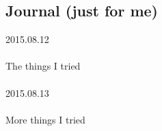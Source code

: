 \subsection{Journal (just for me)}
\horrule{1pt}
2015.08.12
\\\\
The things I tried
\\\\
\horrule{1pt}
2015.08.13
\\\\
More things I tried